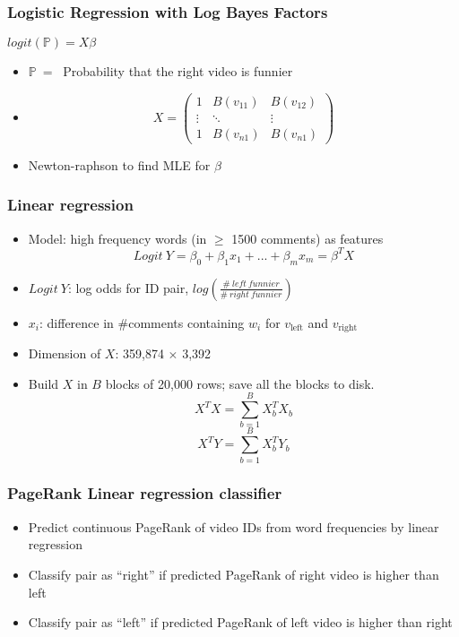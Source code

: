 \documentclass[fleqn]{beamer}
\begin{document}
\begin{frame}
\frametitle{Logistic Regression with Log Bayes Factors}
\begin{center}
$logit(\mathbb{P})=X\beta$
\end{center}
    \begin{itemize}
        \item $\mathbb{P}$\ = \ Probability that the right video is funnier
       \item   \[ X = \left( \begin{array} {ccc}
		     1 & B(v_{11}) & B(v_{12})\\
		      \vdots & \ddots & \vdots \\
		      1 & B(v_{n1}) & B(v_{n1})
		     \end{array} \right)
	 	 \]

       \item Newton-raphson to find MLE for $\beta$

    \end{itemize}
\end{frame}

\begin{frame}
\frametitle{Linear regression}
    \begin{itemize}
     \item Model: high frequency words (in $\geq$ 1500 comments) as features\\
     $$Logit\ Y = \beta_0 + \beta_1 x_1 + ... + \beta_m x_m = \beta^T X$$
     \item $Logit\ Y$: log odds for ID pair, $log(\frac{\#\ left\ funnier}{\#\ right\ funnier})$
     \item $x_i$:  difference in \#comments containing $w_i$ for 
              $v_{\mbox{left}}$ and $v_{\mbox{right}}$
     \item Dimension of $X$: 359,874 $\times$ 3,392
     \item Build $X$ in $B$ blocks of 20,000 rows; save all the blocks to disk.   \\
     $$X^TX = \sum_{b=1}^B X_b^TX_b$$
     $$X^TY = \sum_{b=1}^B X_b^TY_b$$
  \end{itemize}
\end{frame}

\begin{frame}
\frametitle{PageRank Linear regression classifier}
    \begin{itemize}
     \item Predict continuous PageRank of video IDs from word frequencies by linear regression
     \item Classify pair as ``right'' if predicted PageRank of right video is higher than left
     \item Classify pair as ``left'' if predicted PageRank of left video is higher than right
   \end{itemize}
\end{frame}
\end{document}
